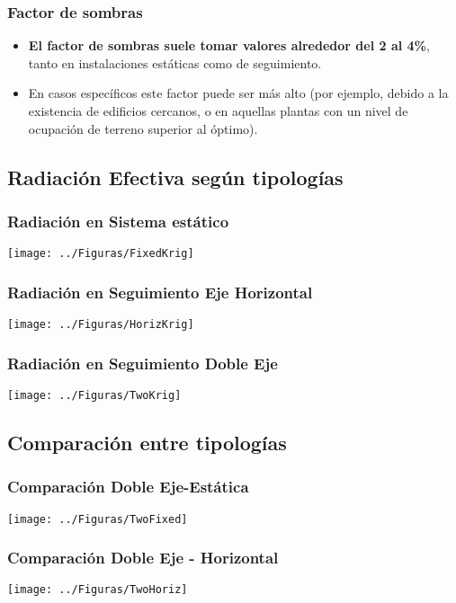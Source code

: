 \documentclass[xcolor=dvipsnames]{beamer}
\begin{document}
\begin{frame}
\frametitle{Factor de sombras}
\begin{itemize}
\item \textbf{El factor de sombras suele tomar valores alrededor del 2 al
4\%}, tanto en instalaciones estáticas como de seguimiento. 
\item En casos específicos este factor puede ser más alto (por ejemplo,
debido a la existencia de edificios cercanos, o en aquellas plantas
con un nivel de ocupación de terreno superior al óptimo).
\end{itemize}

\end{frame}

\subsection{Radiación Efectiva según tipologías}

\begin{frame}[plain]
  \frametitle{Radiación en Sistema estático}

  \texttt{[image: ../Figuras/FixedKrig]}
\end{frame}

\begin{frame}[plain]
  \frametitle{Radiación en Seguimiento Eje Horizontal}

  \texttt{[image: ../Figuras/HorizKrig]}

\end{frame}

\begin{frame}[plain]
  \frametitle{Radiación en Seguimiento Doble Eje}

  \texttt{[image: ../Figuras/TwoKrig]}

\end{frame}

\subsection{Comparación entre tipologías}

\begin{frame}[plain]
  \frametitle{Comparación Doble Eje-Estática}

  \texttt{[image: ../Figuras/TwoFixed]}


\end{frame}

\begin{frame}[plain]
  \frametitle{Comparación Doble Eje - Horizontal}

    \texttt{[image: ../Figuras/TwoHoriz]}

\end{frame}
\end{document}
